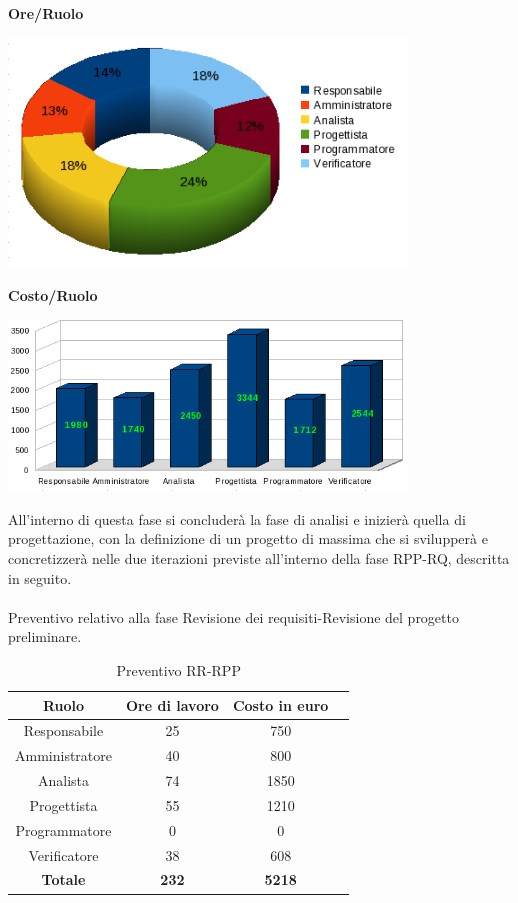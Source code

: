 \newpage
\begin{center}\textbf{Ore/Ruolo}
\end{center}
\includegraphics[width=300pt]{Ore_Totali}

\begin{center}\textbf{Costo/Ruolo}
\end{center}
\includegraphics[width=300pt]{Costi_Totali}

\newpage

All'interno di questa fase si concluder\`a la fase di analisi e inizier\`a quella di progettazione, con la definizione di un progetto di massima che si svilupper\`a e concretizzer\`a nelle due iterazioni previste all'interno della fase RPP-RQ, descritta in seguito. \\
\\
Preventivo relativo alla fase Revisione dei requisiti-Revisione del progetto preliminare.
\begin{table}[h]
	\begin{center}
		  \begin{tabular}{|c|c|c|c|}
		 \hline 
		 \textbf{Ruolo} & \textbf{Ore di lavoro} & \textbf{Costo in euro}\\
		 \hline
		Responsabile & 25 & 750 \\
		Amministratore & 40 & 800\\
		Analista & 74 & 1850\\
		Progettista & 55 & 1210\\
		Programmatore & 0 & 0 \\
		Verificatore & 38 & 608\\
        \hline
        \textbf{Totale} & \textbf{232} & \textbf{5218}\\
		\hline
		\end{tabular}
	\caption{Preventivo RR-RPP} 
	\label{tab:tabella_RR-RPP}
	\end{center}	
\end{table}

